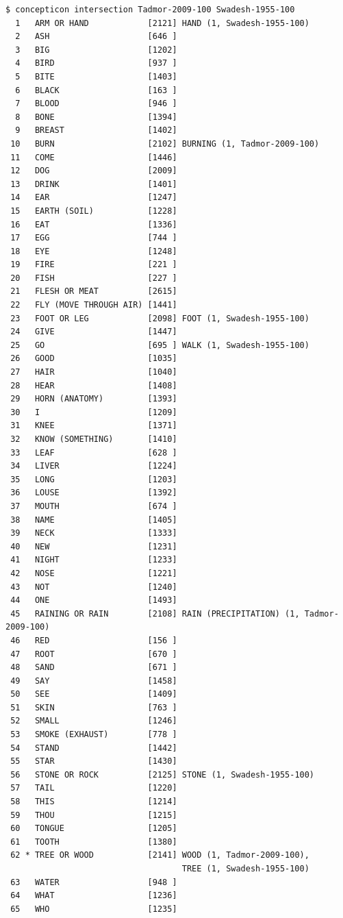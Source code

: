 \documentclass[a4paper,svgnames]{scrartcl}
\begin{document}
\begin{verbatim}
$ concepticon intersection Tadmor-2009-100 Swadesh-1955-100
  1   ARM OR HAND            [2121] HAND (1, Swadesh-1955-100)
  2   ASH                    [646 ] 
  3   BIG                    [1202] 
  4   BIRD                   [937 ] 
  5   BITE                   [1403] 
  6   BLACK                  [163 ] 
  7   BLOOD                  [946 ] 
  8   BONE                   [1394] 
  9   BREAST                 [1402] 
 10   BURN                   [2102] BURNING (1, Tadmor-2009-100)
 11   COME                   [1446] 
 12   DOG                    [2009] 
 13   DRINK                  [1401] 
 14   EAR                    [1247] 
 15   EARTH (SOIL)           [1228] 
 16   EAT                    [1336] 
 17   EGG                    [744 ] 
 18   EYE                    [1248] 
 19   FIRE                   [221 ] 
 20   FISH                   [227 ] 
 21   FLESH OR MEAT          [2615] 
 22   FLY (MOVE THROUGH AIR) [1441] 
 23   FOOT OR LEG            [2098] FOOT (1, Swadesh-1955-100)
 24   GIVE                   [1447] 
 25   GO                     [695 ] WALK (1, Swadesh-1955-100)
 26   GOOD                   [1035] 
 27   HAIR                   [1040] 
 28   HEAR                   [1408] 
 29   HORN (ANATOMY)         [1393] 
 30   I                      [1209] 
 31   KNEE                   [1371] 
 32   KNOW (SOMETHING)       [1410] 
 33   LEAF                   [628 ] 
 34   LIVER                  [1224] 
 35   LONG                   [1203] 
 36   LOUSE                  [1392] 
 37   MOUTH                  [674 ] 
 38   NAME                   [1405] 
 39   NECK                   [1333] 
 40   NEW                    [1231] 
 41   NIGHT                  [1233] 
 42   NOSE                   [1221] 
 43   NOT                    [1240] 
 44   ONE                    [1493] 
 45   RAINING OR RAIN        [2108] RAIN (PRECIPITATION) (1, Tadmor-2009-100)
 46   RED                    [156 ] 
 47   ROOT                   [670 ] 
 48   SAND                   [671 ] 
 49   SAY                    [1458] 
 50   SEE                    [1409] 
 51   SKIN                   [763 ] 
 52   SMALL                  [1246] 
 53   SMOKE (EXHAUST)        [778 ] 
 54   STAND                  [1442] 
 55   STAR                   [1430] 
 56   STONE OR ROCK          [2125] STONE (1, Swadesh-1955-100)
 57   TAIL                   [1220] 
 58   THIS                   [1214] 
 59   THOU                   [1215] 
 60   TONGUE                 [1205] 
 61   TOOTH                  [1380] 
 62 * TREE OR WOOD           [2141] WOOD (1, Tadmor-2009-100), 
                                    TREE (1, Swadesh-1955-100)
 63   WATER                  [948 ] 
 64   WHAT                   [1236] 
 65   WHO                    [1235] 
\end{verbatim}
\end{document}

